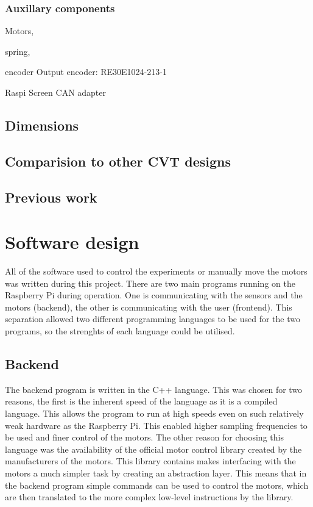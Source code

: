\documentclass[12pt]{article}
\begin{document}
\subsubsection{Auxillary components}
Motors, 

spring, 

encoder
Output encoder: RE30E1024-213-1 \cite{encoder}

Raspi
Screen
CAN adapter




\subsection{Dimensions}

\subsection{Comparision to other CVT designs}


\subsection{Previous work}



\section{Software design}
All of the software used to control the experiments or manually move the motors was written during this project. There are two main programs running on the Raspberry Pi during operation. One is communicating with the sensors and the motors (backend), the other is communicating with the user (frontend). This separation allowed two different programming languages to be used for the two programs, so the strenghts of each language could be utilised.

\subsection{Backend}
The backend program is written in the C++ language. This was chosen for two reasons, the first is the inherent speed of the language as it is a compiled language. This allows the program to run at high speeds even on such relatively weak hardware as the Raspberry Pi. This enabled higher sampling frequencies to be used and finer control of the motors. The other reason for choosing this language was the availability of the official motor control library created by the manufacturers of the motors. This library contains makes interfacing with the motors a much simpler task by creating an abstraction layer. This means that in the backend program simple commands can be used to control the motors, which are then translated to the more complex low-level instructions by the library.
\end{document}
